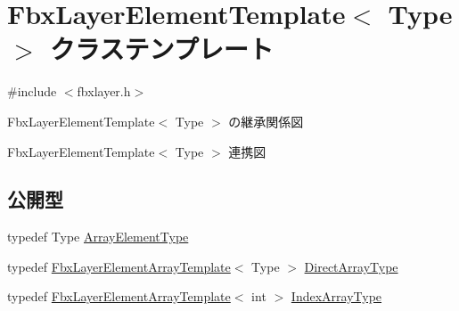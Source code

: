 \hypertarget{class_fbx_layer_element_template}{}\section{Fbx\+Layer\+Element\+Template$<$ Type $>$ クラステンプレート}
\label{class_fbx_layer_element_template}


{\ttfamily \#include $<$fbxlayer.\+h$>$}



Fbx\+Layer\+Element\+Template$<$ Type $>$ の継承関係図


Fbx\+Layer\+Element\+Template$<$ Type $>$ 連携図
\subsection*{公開型}
\begin{DoxyCompactItemize}
\item 
typedef Type \hyperlink{class_fbx_layer_element_template_a24cfd1d513a54140bde996ccfa2bf2b6}{Array\+Element\+Type}
\item 
typedef \hyperlink{class_fbx_layer_element_array_template}{Fbx\+Layer\+Element\+Array\+Template}$<$ Type $>$ \hyperlink{class_fbx_layer_element_template_a1adf77aa24da5ff9786bb19286dcac13}{Direct\+Array\+Type}
\item 
typedef \hyperlink{class_fbx_layer_element_array_template}{Fbx\+Layer\+Element\+Array\+Template}$<$ int $>$ \hyperlink{class_fbx_layer_element_template_ada80e444d13e2a73cb90551a712a58ed}{Index\+Array\+Type}
\end{DoxyCompactItemize}
